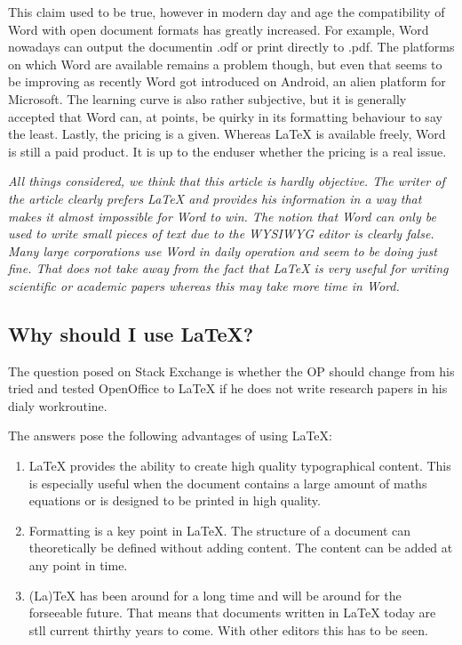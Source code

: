This claim used to be true, however in modern day and age the compatibility of Word with open document formats has greatly increased. For example, Word nowadays can output the documentin .odf or print directly to .pdf. The platforms on which Word are available remains a problem though, but even that seems to be improving as recently Word got introduced on Android, an alien platform for Microsoft. The learning curve is also rather subjective, but it is generally accepted that Word can, at points, be quirky in its formatting behaviour to say the least. Lastly, the pricing is a given. Whereas LaTeX is available freely, Word is still a paid product. It is up to the enduser whether the pricing is a real issue.

\textit{All things considered, we think that this article is hardly objective. The writer of the article clearly prefers LaTeX and provides his information in a way that makes it almost impossible for Word to win. The notion that Word can only be used to write small pieces of text due to the WYSIWYG editor is clearly false. Many large corporations use Word in daily operation and seem to be doing just fine. That does not take away from the fact that LaTeX is very useful for writing scientific or academic papers whereas this may take more time in Word.}


\subsection{Why should I use LaTeX?}
The question posed on Stack Exchange is whether the OP should change from his tried and tested OpenOffice to LaTeX if he does not write research papers in his dialy workroutine.

The answers pose the following advantages of using LaTeX:
\begin{enumerate}
	\item LaTeX provides the ability to create high quality typographical content. This is especially useful when the document contains a large amount of maths equations or is designed to be printed in high quality.
	\item Formatting is a key point in LaTeX. The structure of a document can theoretically be defined without adding content. The content can be added at any point in time.
	\item (La)TeX has been around for a long time and will be around for the forseeable future. That means that documents written in LaTeX today are stll current thirthy years to come. With other editors this has to be seen.
\end{enumerate}

